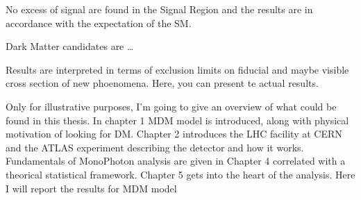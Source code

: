   No excess of signal are found in the Signal Region and the results are in accordance with the expectation of the SM. 
  
  Dark Matter candidates are \dots

  Results are interpreted in terms of exclusion limits on fiducial and maybe visible cross section of new phoenomena. Here, you can present te actual results.
  
  Only for illustrative purposes, I'm going to give an overview of what could be found in this thesis. In chapter 1 MDM model is introduced, along with physical motivation of looking for DM. Chapter 2 introduces the LHC facility at CERN and the ATLAS experiment describing the detector and how it works. Fundamentals of MonoPhoton analysis are given in Chapter 4 correlated with a theorical statistical framework. Chapter 5 gets into the heart of the analysis. Here I will report the results for MDM model %

